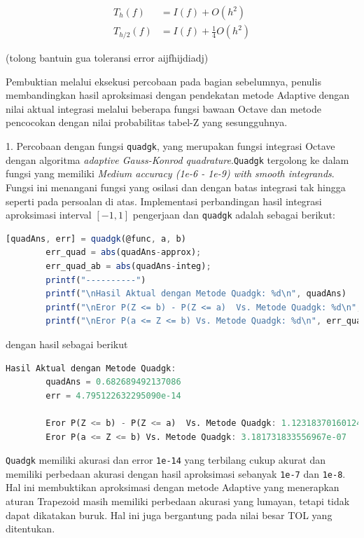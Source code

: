 \documentclass[journal,12pt,onecolumn,a4paper]{IEEEtran}
\begin{document}
\begin{equation*}
	\begin{split}
		T_{h}(f) & = I(f) + O(h^2) \\
		T_{h/2}(f) & = I(f) + \frac{1}{4}O(h^2)
	\end{split}
\end{equation*}

(tolong bantuin gua toleransi error aijfhijdiadj)



Pembuktian melalui eksekusi percobaan pada bagian sebelumnya, penulis membandingkan hasil aproksimasi dengan pendekatan metode Adaptive dengan nilai aktual integrasi melalui beberapa fungsi bawaan Octave dan metode pencocokan dengan nilai probabilitas tabel-Z yang sesungguhnya.

1. Percobaan dengan fungsi \lstinline{quadgk}, yang merupakan fungsi integrasi Octave dengan algoritma \emph{adaptive Gauss-Konrod quadrature}.\lstinline{Quadgk} tergolong ke dalam fungsi yang memiliki \emph{Medium accuracy (1e-6 - 1e-9) with smooth integrands}. Fungsi ini menangani fungsi yang osilasi dan dengan batas integrasi tak hingga seperti pada persoalan di atas. Implementasi perbandingan hasil integrasi aproksimasi interval \([-1,1]\) pengerjaan dan \lstinline{quadgk} adalah sebagai berikut:
\begin{center}
	\begin{lstlisting}[language=Octave]
		[quadAns, err] = quadgk(@func, a, b)
		err_quad = abs(quadAns-approx);
		err_quad_ab = abs(quadAns-integ);
		printf("----------")
		printf("\nHasil Aktual dengan Metode Quadgk: %d\n", quadAns)
		printf("\nEror P(Z <= b) - P(Z <= a)  Vs. Metode Quadgk: %d\n", err_quad)
		printf("\nEror P(a <= Z <= b) Vs. Metode Quadgk: %d\n", err_quad_ab)
	\end{lstlisting}
\end{center}

dengan hasil sebagai berikut

\begin{center}
	\begin{lstlisting}[language=Octave]
		Hasil Aktual dengan Metode Quadgk: 
		quadAns = 0.682689492137086
		err = 4.795122632295090e-14  

		Eror P(Z <= b) - P(Z <= a)  Vs. Metode Quadgk: 1.123183701601249e-08
		Eror P(a <= Z <= b) Vs. Metode Quadgk: 3.181731833556967e-07
	\end{lstlisting}
\end{center}

\lstinline{Quadgk} memiliki akurasi dan error \lstinline{1e-14} yang terbilang cukup akurat dan memiliki perbedaan akurasi dengan hasil aproksimasi sebanyak \lstinline{1e-7} dan \lstinline{1e-8}. Hal ini membuktikan aproksimasi dengan metode Adaptive yang menerapkan aturan Trapezoid masih memiliki perbedaan akurasi yang lumayan, tetapi tidak dapat dikatakan buruk. Hal ini juga bergantung pada nilai besar TOL yang ditentukan.
\end{document}

